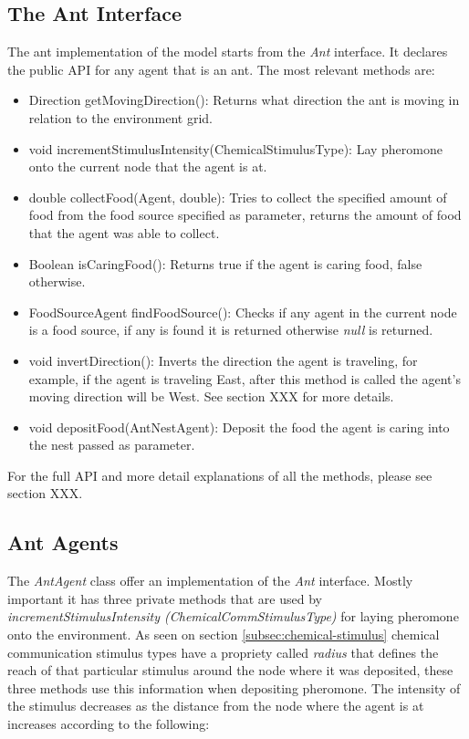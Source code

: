 \subsection{The Ant Interface}

The ant implementation of the model starts from the \emph{Ant} interface. It declares the public \ac{API} for any agent that is an ant. The most relevant methods are: 

\begin{itemize}
  \item Direction getMovingDirection(): Returns what direction the ant is moving in relation to the environment grid.
  \item void incrementStimulusIntensity(ChemicalStimulusType): Lay pheromone onto the current node that the agent is at.
  \item double collectFood(Agent, double): Tries to collect the specified amount of food from the food source specified as parameter, returns the amount of food that the agent was able to collect.
  \item Boolean isCaringFood(): Returns true if the agent is caring food, false otherwise.
  \item FoodSourceAgent findFoodSource(): Checks if any agent in the current node is a food source, if any is found it is returned otherwise \emph{null} is returned.
  \item void invertDirection(): Inverts the direction the agent is traveling, for example, if the agent is traveling East, after this method is called the agent’s moving direction will be West. See section XXX for more details.
  \item void depositFood(AntNestAgent): Deposit the food the agent is caring into the nest passed as parameter.
\end{itemize}

For the full \ac{API} and more detail explanations of all the methods, please see section XXX.

\subsection{Ant Agents}
\label{sec:pheromone-deposit}

The \emph{AntAgent} class offer an implementation of the \emph{Ant} interface. Mostly important it has three private methods that are used by \emph{incrementStimulusIntensity (ChemicalCommStimulusType)} for laying pheromone onto the environment. As seen on section \ref{subsec:chemical-stimulus} chemical communication stimulus types have a propriety called \emph{radius} that defines the reach of that particular stimulus around the node where it was deposited, these three methods use this information when depositing pheromone. The intensity of the stimulus decreases as the distance from the node where the agent is at increases according to the following: 

